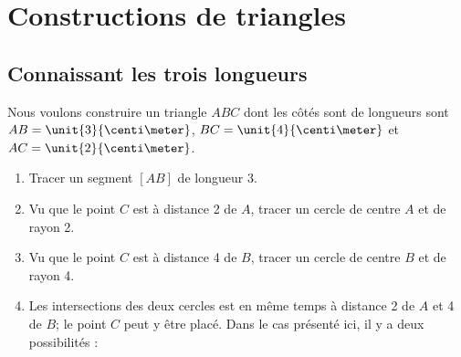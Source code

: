 


\section{Constructions de triangles}

\subsection{Connaissant les trois longueurs}

Nous voulons construire un triangle \(ABC\) dont les côtés sont de longueurs sont \( AB=\unit{3}{\centi\meter}\), \( BC=\unit{4}{\centi\meter}\) et \( AC=\unit{2}{\centi\meter}\).


\begin{enumerate}
    \item
        Tracer un segment \( [AB]\) de longueur \unit{3}{\centi\meter}.
\begin{center}
   
\end{center}
    \item
        Vu que le point \( C\) est à distance \unit{2}{\centi\meter} de \( A\), tracer un cercle de centre \( A\) et de rayon \unit{2}{\centi\meter}.
    \item
        Vu que le point \( C\) est à distance \unit{4}{\centi\meter} de \( B\), tracer un cercle de centre \( B\) et de rayon \unit{4}{\centi\meter}.
\begin{center}
   
\end{center}
    \item
        Les intersections des deux cercles est en même temps à distance \unit{2}{\centi\meter} de \( A\) et \unit{4}{\centi\meter} de \( B\); le point \( C\) peut y être placé. Dans le cas présenté ici, il y a deux possibilités :

\begin{center}
   
\end{center}

\end{enumerate}

